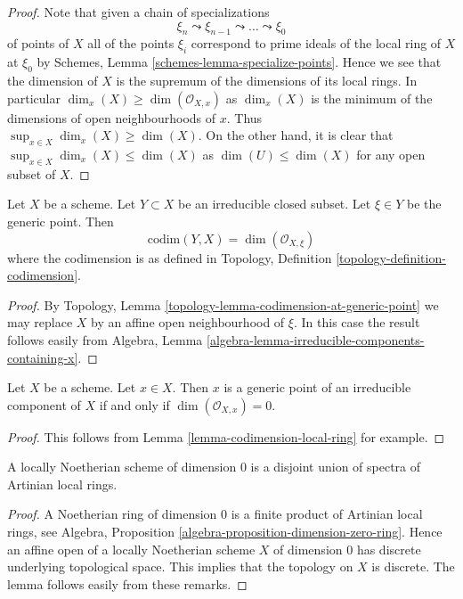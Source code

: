 \begin{proof}
Note that given a chain of specializations
$$
\xi_n \leadsto \xi_{n - 1} \leadsto \ldots \leadsto \xi_0
$$
of points of $X$ all of the points $\xi_i$ correspond to prime ideals
of the local ring of $X$ at $\xi_0$ by
Schemes, Lemma \ref{schemes-lemma-specialize-points}.
Hence we see that the dimension of $X$ is the supremum of the dimensions
of its local rings. In particular $\dim_x(X) \geq \dim(\mathcal{O}_{X, x})$
as $\dim_x(X)$ is the minimum of the dimensions of open neighbourhoods of
$x$. Thus $\sup_{x \in X} \dim_x(X) \geq \dim(X)$. On the other hand,
it is clear that $\sup_{x \in X} \dim_x(X) \leq \dim(X)$
as $\dim(U) \leq \dim(X)$ for any open subset of $X$.
\end{proof}

\begin{lemma}
\label{lemma-codimension-local-ring}
Let $X$ be a scheme. Let $Y \subset X$ be an irreducible closed
subset. Let $\xi \in Y$ be the generic point. Then
$$
\text{codim}(Y, X) = \dim(\mathcal{O}_{X, \xi})
$$
where the codimension is as defined in
Topology, Definition \ref{topology-definition-codimension}.
\end{lemma}

\begin{proof}
By Topology, Lemma \ref{topology-lemma-codimension-at-generic-point}
we may replace $X$ by an affine open neighbourhood of $\xi$. In this
case the result follows easily from
Algebra, Lemma \ref{algebra-lemma-irreducible-components-containing-x}.
\end{proof}

\begin{lemma}
\label{lemma-generic-point}
Let $X$ be a scheme. Let $x \in X$. Then $x$ is a generic point of
an irreducible component of $X$ if and only if $\dim(\mathcal{O}_{X, x}) = 0$.
\end{lemma}

\begin{proof}
This follows from Lemma \ref{lemma-codimension-local-ring} for example.
\end{proof}

\begin{lemma}
\label{lemma-locally-Noetherian-dimension-0}
A locally Noetherian scheme of dimension $0$ is a disjoint
union of spectra of Artinian local rings.
\end{lemma}

\begin{proof}
A Noetherian ring of dimension $0$ is a finite product of Artinian local
rings, see
Algebra, Proposition \ref{algebra-proposition-dimension-zero-ring}.
Hence an affine open of a locally Noetherian scheme $X$ of dimension
$0$ has discrete underlying topological space. This implies that
the topology on $X$ is discrete. The lemma follows easily from these
remarks.
\end{proof}

